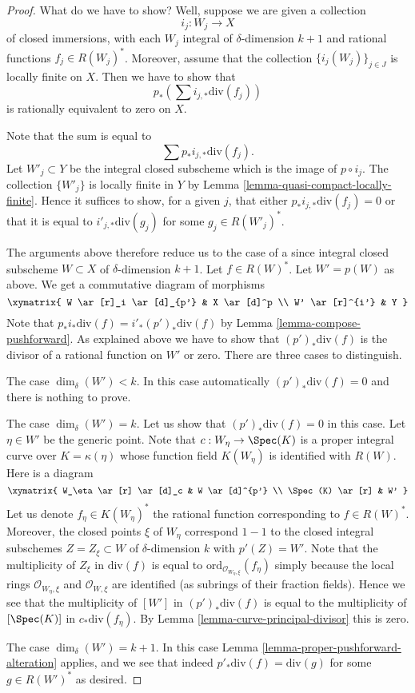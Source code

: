 \begin{proof}
What do we have to show? Well, suppose we are given a collection
$$
i_j : W_j \longrightarrow X
$$
of closed immersions, with each $W_j$ integral of $\delta$-dimension $k + 1$
and rational functions $f_j \in R(W_j)^*$.
Moreover, assume that
the collection $\{i_j(W_j)\}_{j \in J}$ is locally finite on $X$.
Then we have to show that
$$
p_*\left(\sum i_{j, *}\text{div}(f_j)\right)
$$
is rationally equivalent to zero on $X$.

\medskip\noindent
Note that the sum is equal to
$$
\sum p_*i_{j, *}\text{div}(f_j).
$$
Let $W'_j \subset Y$ be the integral closed subscheme which is the
image of $p \circ i_j$. The collection $\{W'_j\}$ is locally finite
in $Y$ by Lemma \ref{lemma-quasi-compact-locally-finite}.
Hence it suffices to show, for a given $j$, that either
$p_*i_{j, *}\text{div}(f_j) = 0$ or that it
is equal to $i'_{j, *}\text{div}(g_j)$ for some $g_j \in R(W'_j)^*$.

\medskip\noindent
The arguments above therefore reduce us to the case of a since
integral closed subscheme $W \subset X$ of $\delta$-dimension $k + 1$.
Let $f \in R(W)^*$. Let $W' = p(W)$ as above.
We get a commutative diagram of morphisms
$$
\xymatrix{
W \ar[r]_i \ar[d]_{p'} & X \ar[d]^p \\
W' \ar[r]^{i'} & Y
}
$$
Note that $p_*i_*\text{div}(f) = i'_*(p')_*\text{div}(f)$ by
Lemma \ref{lemma-compose-pushforward}. As explained above
we have to show that $(p')_*\text{div}(f)$
is the divisor of a rational function on $W'$ or zero.
There are three cases to distinguish.

\medskip\noindent
The case $\dim_\delta(W') < k$. In this case automatically
$(p')_*\text{div}(f) = 0$ and there is nothing to prove.

\medskip\noindent
The case $\dim_\delta(W') = k$. Let us show that $(p')_*\text{div}(f) = 0$
in this case. Let $\eta \in W'$ be the generic point.
Note that $c : W_\eta \to \Spec(K)$
is a proper integral curve over $K = \kappa(\eta)$
whose function field $K(W_\eta)$ is identified with $R(W)$.
Here is a diagram
$$
\xymatrix{
W_\eta \ar[r] \ar[d]_c & W \ar[d]^{p'} \\
\Spec(K) \ar[r] & W'
}
$$
Let us denote $f_\eta \in K(W_\eta)^*$ the rational function
corresponding to $f \in R(W)^*$.
Moreover, the closed points $\xi$ of $W_\eta$ correspond $1 - 1$ to the
closed integral subschemes $Z = Z_\xi \subset W$ of $\delta$-dimension $k$
with $p'(Z) = W'$. Note that the multiplicity
of $Z_\xi$ in $\text{div}(f)$ is equal to
$\text{ord}_{\mathcal{O}_{W_\eta, \xi}}(f_\eta)$ simply because the
local rings $\mathcal{O}_{W_\eta, \xi}$ and $\mathcal{O}_{W, \xi}$
are identified (as subrings of their fraction fields).
Hence we see that the multiplicity of $[W']$ in
$(p')_*\text{div}(f)$ is equal to the multiplicity of
$[\Spec(K)]$ in $c_*\text{div}(f_\eta)$.
By Lemma \ref{lemma-curve-principal-divisor} this is zero.

\medskip\noindent
The case $\dim_\delta(W') = k + 1$. In this case
Lemma \ref{lemma-proper-pushforward-alteration} applies,
and we see that indeed $p'_*\text{div}(f) = \text{div}(g)$
for some $g \in R(W')^*$ as desired.
\end{proof}
